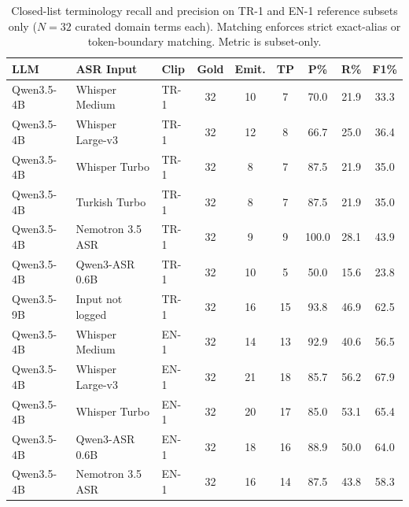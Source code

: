\begin{table}[t]
\caption{Closed-list terminology recall and precision on TR-1 and EN-1 reference subsets only ($N=32$ curated domain terms each). Matching enforces strict exact-alias or token-boundary matching. Metric is subset-only.}
\label{tab:gold-recall}
\centering
\renewcommand{\arraystretch}{1.15}
\begin{tabular}{lllcccccc}
\toprule
\textbf{LLM} & \textbf{ASR Input} & \textbf{Clip} & \textbf{Gold} & \textbf{Emit.} & \textbf{TP} & \textbf{P\%} & \textbf{R\%} & \textbf{F1\%} \\
\midrule
Qwen3.5-4B & Whisper Medium   & TR-1 & 32 & 10 & 7  & 70.0 & 21.9 & 33.3 \\
Qwen3.5-4B & Whisper Large-v3 & TR-1 & 32 & 12 & 8  & 66.7 & 25.0 & 36.4 \\
Qwen3.5-4B & Whisper Turbo    & TR-1 & 32 & 8  & 7  & 87.5 & 21.9 & 35.0 \\
Qwen3.5-4B & Turkish Turbo    & TR-1 & 32 & 8  & 7  & 87.5 & 21.9 & 35.0 \\
Qwen3.5-4B & Nemotron 3.5 ASR & TR-1 & 32 & 9  & 9  & 100.0 & 28.1 & 43.9 \\
Qwen3.5-4B & Qwen3-ASR 0.6B   & TR-1 & 32 & 10 & 5  & 50.0 & 15.6 & 23.8 \\
Qwen3.5-9B & Input not logged & TR-1 & 32 & 16 & 15 & 93.8 & 46.9 & 62.5 \\
\midrule
Qwen3.5-4B & Whisper Medium   & EN-1 & 32 & 14 & 13 & 92.9 & 40.6 & 56.5 \\
Qwen3.5-4B & Whisper Large-v3 & EN-1 & 32 & 21 & 18 & 85.7 & 56.2 & 67.9 \\
Qwen3.5-4B & Whisper Turbo    & EN-1 & 32 & 20 & 17 & 85.0 & 53.1 & 65.4 \\
Qwen3.5-4B & Qwen3-ASR 0.6B   & EN-1 & 32 & 18 & 16 & 88.9 & 50.0 & 64.0 \\
Qwen3.5-4B & Nemotron 3.5 ASR & EN-1 & 32 & 16 & 14 & 87.5 & 43.8 & 58.3 \\
\bottomrule
\end{tabular}
\end{table}
